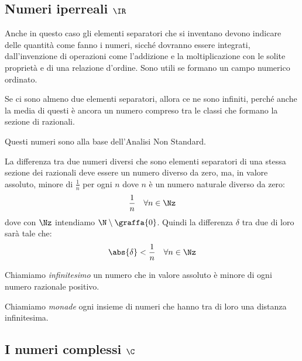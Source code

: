 \subsection{Numeri iperreali \(\IR\)}


Anche in questo caso gli elementi separatori che si inventano devono indicare 
delle quantità come fanno i numeri, sicché dovranno essere integrati, 
dall'invenzione di operazioni come l'addizione e la moltiplicazione con le 
solite proprietà e di una relazione d'ordine. Sono utili se formano un campo 
numerico ordinato.

Se ci sono almeno due elementi separatori, allora ce ne sono infiniti, 
perché anche la media di questi è ancora un numero compreso tra le classi 
che formano la sezione di razionali.

Questi numeri sono alla base dell'Analisi Non Standard.

La differenza tra due numeri diversi che sono elementi separatori di una 
stessa sezione dei razionali deve essere un numero diverso 
da zero, ma, in valore assoluto, minore di \(\frac{1}{n}\) per ogni \(n\) 
dove \(n\) è un numero naturale diverso da zero: 
\[\dfrac{1}{n} \quad \forall n \in \Nz\]
dove con \(\Nz\) intendiamo \(\N \setminus \graffa{0}\).
Quindi la differenza \(\delta\) tra due di loro sarà tale che: 
\[\abs{\delta} < \dfrac{1}{n} \quad \forall n \in \Nz\]

Chiamiamo \emph{infinitesimo} un numero che in valore assoluto è minore di 
ogni numero razionale positivo.

Chiamiamo \emph{monade} ogni insieme di numeri che hanno tra di loro una 
distanza infinitesima.

\subsection{I numeri complessi \(\C\)}
\label{subsec:insnum_complessi}


